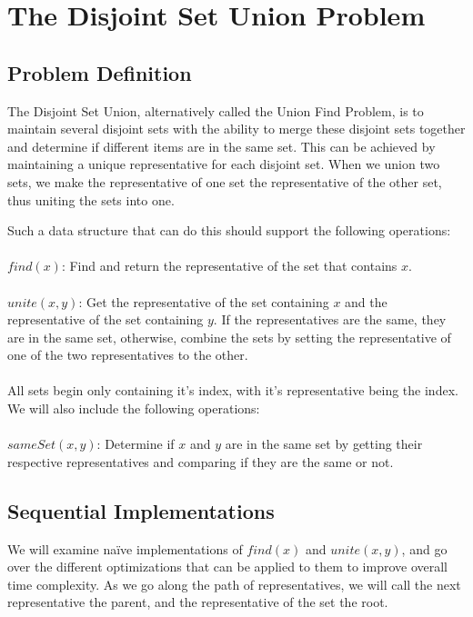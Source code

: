 \documentclass[conference]{IEEEtran}
\begin{document}


\section{The Disjoint Set Union Problem}

\subsection{Problem Definition}
The Disjoint Set Union, alternatively called the Union Find Problem, is to maintain several disjoint sets with the ability to merge these disjoint sets together and determine if different items are in the same set. This can be achieved by maintaining a unique representative for each disjoint set. When we union two sets, we make the representative of one set the representative of the other set, thus uniting the sets into one.

Such a data structure that can do this should support the following operations: \\ \\
$find(x)$: Find and return the representative of the set that contains $x$. \\ \\
$unite(x, y)$: Get the representative of the set containing $x$ and the representative of the set containing $y$. If the representatives are the same, they are in the same set, otherwise, combine the sets by setting the representative of one of the two representatives to the other. \\ \\
All sets begin only containing it's index, with it's representative being the index. We will also include the following operations: \\ \\
$sameSet(x, y)$: Determine if $x$ and $y$ are in the same set by getting their respective representatives and comparing if they are the same or not.

\subsection{Sequential Implementations}

We will examine naïve implementations of $find(x)$ and $unite(x, y)$, and go over the different optimizations that can be applied to them to improve overall time complexity. As we go along the path of representatives, we will call the next representative the parent, and the representative of the set the root.
\end{document}
